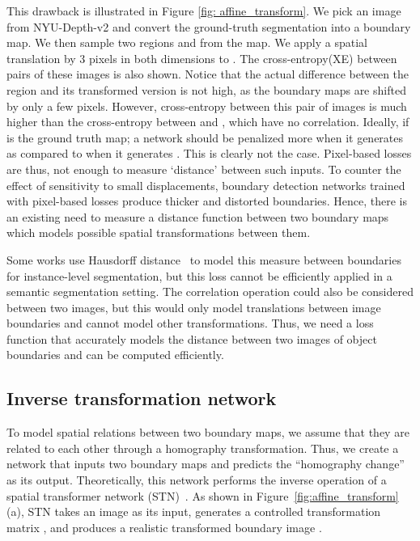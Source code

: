 \documentclass[final]{cvpr}
\begin{document}
This drawback is illustrated in Figure \ref{fig: affine_transform}. We pick an image from NYU-Depth-v2 and convert the ground-truth segmentation into a boundary map. We then sample two regions  and  from the map. We apply a spatial translation by 3 pixels in both dimensions to . The cross-entropy(XE) between pairs of these images is also shown. Notice that the actual difference between the region  and its transformed version  is not high, as the boundary maps are shifted by only a few pixels. However, cross-entropy between this pair of images is much higher than the cross-entropy between  and , which have no correlation. Ideally, if  is the ground truth map; a network should be penalized more when it generates  as compared to when it generates . This is clearly not the case. Pixel-based losses are thus, not enough to measure `distance' between such inputs. To counter the effect of sensitivity to small displacements, boundary detection networks trained with pixel-based losses produce thicker and distorted boundaries. Hence, there is an existing need to measure a distance function between two boundary maps which models possible spatial transformations between them.

Some works use Hausdorff distance~\cite{hausdorff1} to model this measure between boundaries for instance-level segmentation, but this loss cannot be efficiently applied in a semantic segmentation setting. The correlation operation could also be considered between two images, but this would only model translations between image boundaries and cannot model other transformations. Thus, we need a loss function that accurately models the distance between two images of object boundaries and can be computed efficiently.


\subsection{Inverse transformation network}\label{sec:inv_transf_network}

To model spatial relations between two boundary maps, we assume that they are related to each other through a homography transformation. Thus, we create a network that inputs two boundary maps and predicts the ``homography change'' as its output. Theoretically, this network performs the inverse operation of a spatial transformer network (STN)~\cite{spatialtx}. As shown in Figure~\ref{fig:affine_transform}(a), STN takes an image  as its input, generates a controlled transformation matrix , and produces a realistic transformed boundary image . 
\end{document}
